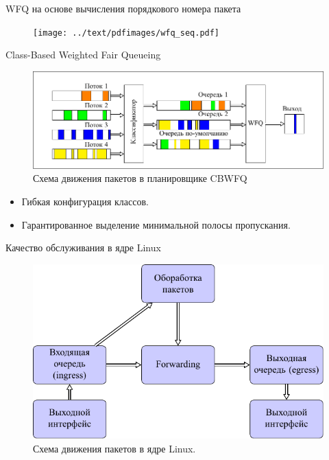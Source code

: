 \documentclass[12pt]{beamer}
\begin{document}
\begin{frame}{WFQ на основе вычисления порядкового номера пакета}
	\begin{figure}
		\center
    	\texttt{[image: ../text/pdfimages/wfq\_seq.pdf]}
	\end{figure}
\end{frame}

\begin{frame}{Class-Based Weighted Fair Queueing}
	\begin{figure}
		\center
    	\includegraphics[scale=0.8]{../text/pdfimages/cbwfq.pdf}
		\caption*{Схема движения пакетов в планировщике CBWFQ}
	\end{figure}

	\begin{center}
{\footnotesize
	\begin{itemize}
		\item Гибкая конфигурация классов.
		\item Гарантированное выделение минимальной полосы пропускания.
	\end{itemize}
}
	\end{center}
\end{frame}


\begin{frame}{Качество обслуживания в ядре Linux}
	\begin{figure}
		\center
    	\includegraphics[scale=0.8]{../text/pdfimages/qdisc.pdf}
		\caption*{Схема движения пакетов в ядре Linux.}
	\end{figure}
\end{frame}
\end{document}
